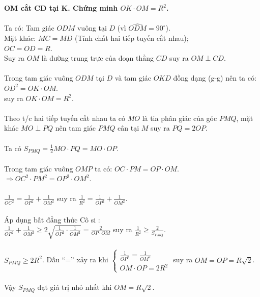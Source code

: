 \begin{ex}
{\begin{center}
	\end{center}
	\noindent
	\textbf{OM cắt CD tại K. Chứng minh $OK \cdot OM = R^2$.} \\
	\\
	Ta có: Tam giác $ODM$ vuông tại $D$ (vì $\widehat{ODM} = 90^\circ$). \\
	Mặt khác: $MC = MD$ (Tính chất hai tiếp tuyến cắt nhau); \\
	$OC = OD = R$. \\
	Suy ra $OM$ là đường trung trực của đoạn thẳng $CD$ suy ra $OM \perp CD$. \\
	\\
	Trong tam giác vuông $ODM$ tại $D$ và tam giác $OKD$ đồng dạng (g-g) nên ta có: \\
	$OD^2 = OK \cdot OM$. \\
	suy ra $OK \cdot OM = R^2$. \\
	\\
	Theo t/c hai tiếp tuyến cắt nhau ta có $MO$ là tia phân giác của góc $PMQ$, mặt \\
	khác $MO \perp PQ$ nên tam giác $PMQ$ cân tại $M$ suy ra $PQ = 2OP$. \\
	\\
	Ta có $S_{PMQ} = \frac{1}{2} MO \cdot PQ = MO \cdot OP$. \\
	\\
	Trong tam giác vuông $OMP$ ta có: $OC \cdot PM = OP \cdot OM$. \\
	$\Rightarrow OC^2 \cdot PM^2 = OP^2 \cdot OM^2$. \\
	\\
	$\frac{1}{OC^2} = \frac{1}{OP^2} + \frac{1}{OM^2}$ suy ra $\frac{1}{R^2} = \frac{1}{OP^2} + \frac{1}{OM^2}$. \\
	\\
	Áp dụng bất đẳng thức Cô si : \\
	$\frac{1}{OP^2} + \frac{1}{OM^2} \ge 2 \sqrt{\frac{1}{OP^2} \cdot \frac{1}{OM^2}} = \frac{2}{OP \cdot OM}$ suy ra $\frac{1}{R^2} \ge \frac{2}{S_{PMQ}}$. \\
	\\
	$S_{PMQ} \ge 2R^2$. Dấu “=” xảy ra khi
	$\begin{cases}
		\frac{1}{OP^2} = \frac{1}{OM^2} \\
		OM \cdot OP = 2R^2
	\end{cases}$
	suy ra $OM = OP = R\sqrt{2}$. \\
	\\
	Vậy $S_{PMQ}$ đạt giá trị nhỏ nhất khi $OM = R\sqrt{2}$. \\
}
\end{ex}
